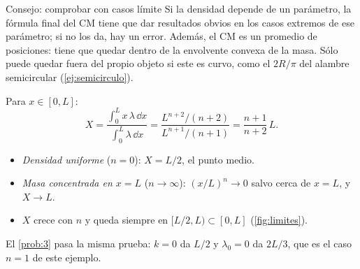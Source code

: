 \begin{clave}[violeta]{Consejo: comprobar con casos límite}
Si la densidad depende de un parámetro, la fórmula final del CM tiene que dar
resultados obvios en los casos extremos de ese parámetro; si no los da, hay
un error. Además, el CM es un promedio de posiciones: tiene que quedar dentro
de la envolvente convexa de la masa. Sólo puede quedar fuera del propio objeto
si este es curvo, como el $2R/\pi$ del alambre semicircular (\cref{ej:semicirculo}).
\end{clave}

\begin{ejemplo}[Varilla con $\lambda=\lambda_{0}(x/L)^{n}$]
\label{ej:limites}
Para $x\in[0,L]$:
\[
  X=\frac{\int_{0}^{L}x\,\lambda\,\dd x}{\int_{0}^{L}\lambda\,\dd x}
  =\frac{L^{n+2}/(n+2)}{L^{n+1}/(n+1)}=\frac{n+1}{n+2}\,L .
\]
\begin{itemize}
  \item \emph{Densidad uniforme} ($n=0$): $X=L/2$, el punto medio.
  \item \emph{Masa concentrada en $x=L$} ($n\to\infty$): $(x/L)^{n}\to0$ salvo cerca de $x=L$, y $X\to L$.
  \item $X$ crece con $n$ y queda siempre en $[L/2,L)\subset[0,L]$ (\cref{fig:limites}).
\end{itemize}
El \cref{prob:3} pasa la misma prueba: $k=0$ da $L/2$ y $\lambda_{0}=0$ da $2L/3$, que es el
caso $n=1$ de este ejemplo.
\end{ejemplo}

